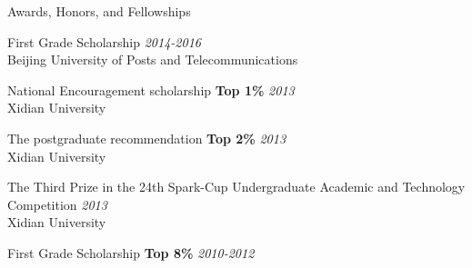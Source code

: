 \documentclass{resume} %
\begin{document}


\begin{rSection}{Awards, Honors, and Fellowships}

First Grade Scholarship \hfill {\em 2014-2016} \\ 
Beijing University of Posts and Telecommunications

National Encouragement scholarship \textbf{Top 1\%} \hfill {\em 2013}\\
Xidian University

The postgraduate recommendation \textbf{Top 2\%} \hfill {\em 2013}\\
Xidian University

The Third Prize in the 24th Spark-Cup Undergraduate Academic and Technology Competition \hfill {\em 2013}\\
Xidian University

First Grade Scholarship \textbf{Top 8\%} \hfill {\em 2010-2012}



\end{rSection}
\end{document}
